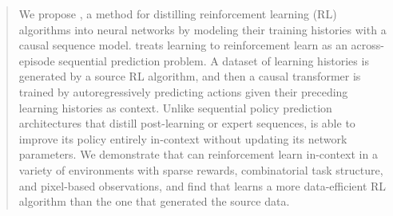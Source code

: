 \begin{abstract}

We propose \namedefnospace, a method for distilling reinforcement learning (RL) algorithms into neural networks by modeling their training histories with a causal sequence model. \fullname treats learning to reinforcement learn as an across-episode sequential prediction problem. A dataset of learning histories is generated by a source RL algorithm, and then a causal transformer is trained by autoregressively predicting actions given their preceding learning histories as context. Unlike sequential policy prediction architectures that distill post-learning or expert sequences, \name is able to improve its policy entirely in-context without updating its network parameters. We demonstrate that \name can reinforcement learn in-context in a variety of environments with sparse rewards, combinatorial task structure, and pixel-based observations, and find that \name learns a more data-efficient RL algorithm than the one that generated the source data.
\end{abstract}

